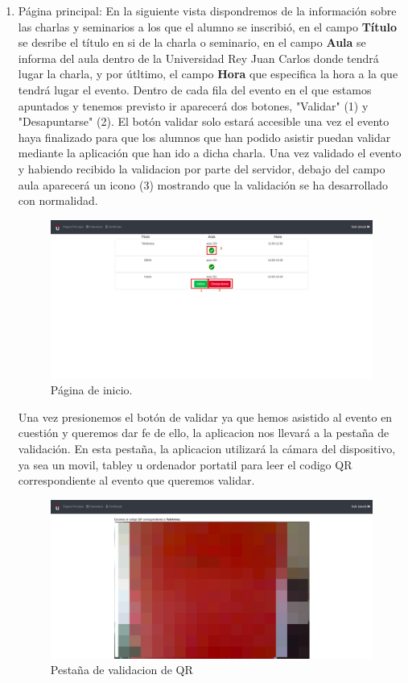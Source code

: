 \documentclass[a4paper, 12pt]{book}
\begin{document}
\begin{enumerate}
  \item Página principal: En la siguiente vista dispondremos de la información sobre las charlas y seminarios a los que el alumno se inscribió, en el campo \textbf{Título} se desribe el título en si de la charla o seminario, en el campo \textbf{Aula} se informa del aula dentro de la Universidad Rey Juan Carlos donde tendrá lugar la charla, y por útltimo, el campo \textbf{Hora} que especifica la hora a la que tendrá lugar el evento.
  Dentro de cada fila del evento en el que estamos apuntados y tenemos previsto ir aparecerá dos botones, "Validar" (1) y "Desapuntarse" (2). El botón validar solo estará accesible una vez el evento haya finalizado para que los alumnos que han podido asistir puedan validar mediante la aplicación que han ido a dicha charla. Una vez validado el evento y habiendo recibido la validacion por parte del servidor, debajo del campo aula aparecerá un icono (3) mostrando que la validación se ha desarrollado con normalidad.
  \begin{figure}[H]
  	\centering
  	\includegraphics[width=16cm, keepaspectratio]{img/inicio.png}
  	\caption{Página de inicio.}\label{fig:inicio}
	\end{figure}
	
	Una vez presionemos el botón de validar ya que hemos asistido al evento en cuestión y queremos dar fe de ello, la aplicacion nos llevará a la pestaña de validación. 
	En esta pestaña, la aplicacion utilizará la cámara del dispositivo, ya sea un movil, tabley u ordenador portatil para leer el codigo QR correspondiente al evento que queremos validar.
	\begin{figure}[H]
  	\centering
  	\includegraphics[width=16cm, keepaspectratio]{img/validarQR.png}
  	\caption{Pestaña de validacion de QR}\label{fig:validarQR}
	\end{figure}


\end{enumerate}
\end{document}
